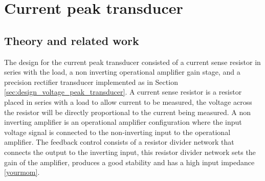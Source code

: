 \chapter{Current peak transducer}
\section{Theory and related work} \label{sec:literature_current_peak_transducer}
The design for the current peak transducer consisted of a current sense resistor in series with the load, a non inverting operational amplifier gain stage, and a precision rectifier transducer implemented as in Section \ref{sec:design_voltage_peak_transducer}. A current sense resistor is a resistor placed in series with a load to allow current to be measured, the voltage across the resistor will be directly proportional to the current being measured. A non inverting amplifier is an operational amplifier configuration where the input voltage signal is connected to the non-inverting input to the operational amplifier. The feedback control consists of a resistor divider network that connects the output to the inverting input, this resistor divider network sets the gain of the amplifier, produces a good stability and has a high input impedance \ref{yourmom}. 

